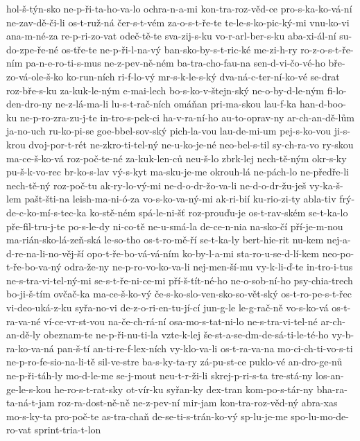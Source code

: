 hol-š-týn-sko
ne-p-ři-ta-ho-va-lo
ochra-n-a-mi
kon-tra-roz-věd-ce
pro-s-ka-ko-vá-ní
ne-zav-dě-či-li
os-t-ruž-ná
čer-s-t-vém
za-o-s-t-ře-te
te-le-s-ko-pic-ký-mi
vnu-ko-vi
ana-m-né-za
re-p-ri-zo-vat
odeč-tě-te
sva-zij-s-ku
vo-r-arl-ber-s-ku
aba-xi-ál-ní
su-do-zpe-ře-né
os-tře-te
ne-p-ři-l-na-vý
ban-sko-by-s-t-ric-ké
me-zi-h-ry
ro-z-o-s-t-ře-ním
pa-n-e-ro-ti-s-mus
ne-z-pev-ně-ném
ba-tra-cho-fau-na
sen-d-vi-čo-vé-ho
bře-zo-vá-ole-š-ko
ko-run-ních
ri-f-lo-vý
mr-s-k-le-s-ký
dva-ná-c-ter-ní-ko-vé
se-drat
roz-bře-s-ku
za-kuk-le-ným
e-mai-lech
bo-s-ko-v-štejn-ský
ne-o-by-d-le-ným
fi-lo-den-dro-ny
ne-z-lá-ma-li
lu-s-t-rač-ních
omáňan
pri-ma-skou
lau-f-ka
han-d-boo-ku
ne-p-ro-zra-zu-j-te
in-tro-s-pek-ci
ha-v-ra-ní-ho
au-to-oprav-ny
ar-ch-an-dě-lům
ja-no-uch
ru-ko-pi-se
goe-bbel-sov-ský
pich-la-vou
lau-de-mi-um
pej-s-ko-vou
ji-s-krou
dvoj-por-t-rét
ne-zkro-ti-tel-ný
ne-u-ko-je-né
neo-bel-s-til
sy-ch-ra-vo
ry-skou
ma-ce-š-ko-vá
roz-poč-te-né
za-kuk-len-ců
neu-š-lo
zbrk-lej
nech-tě-ným
okr-s-ky
pu-š-k-vo-rec
br-ko-s-lav
vý-s-kyt
ma-sku-je-me
okrouh-lá
ne-pách-lo
ne-předře-li
nech-tě-ný
roz-poč-tu
ak-ry-lo-vý-mi
ne-d-o-dr-žo-va-li
ne-d-o-dr-žu-ješ
vy-ka-š-lem
pašt-šti-na
leish-ma-ni-ó-za
vo-s-ko-va-ný-mi
ak-ri-bií
ku-rio-zi-ty
abla-tiv
frý-de-c-ko-mí-s-tec-ka
ko-stě-ném
spá-le-ni-šť
roz-prouďu-je
os-t-rav-ském
se-t-ka-lo
pře-fil-tru-j-te
po-s-le-dy
ni-co-tě
ne-u-smá-la
de-ce-n-nia
na-sko-čí
pří-je-m-nou
ma-rián-sko-lá-zeň-ská
le-so-tho
os-t-ro-mě-ří
se-t-ka-ly
bert-hie-rit
nu-kem
nej-a-d-re-na-li-no-věj-ší
opo-t-ře-bo-vá-vá-ním
ko-by-l-a-mi
sta-ro-u-se-d-lí-kem
neo-po-t-ře-bo-va-ný
odra-že-ny
ne-p-ro-vo-ko-va-li
nej-men-ší-mu
vy-k-li-ď-te
in-tro-i-tus
ne-s-tra-vi-tel-ný-mi
se-s-t-ře-ni-ce-mi
pří-š-tít-né-ho
ne-o-sob-ní-ho
psy-chia-trech
bo-ji-š-tím
ovčač-ka
ma-ce-š-ko-vý
če-s-ko-slo-ven-sko-so-vět-ský
os-t-ro-pe-s-t-řec
vi-deo-uká-z-ku
syřa-no-vi
de-z-o-ri-en-tu-jí-cí
jun-g-le
le-g-rač-ně
vo-s-ko-vá
os-t-ra-va-né
ví-ce-vr-st-vou
na-če-ch-rá-ní
osa-mo-s-tat-ni-lo
ne-s-tra-vi-tel-né
ar-ch-an-dě-ly
obeznam-te
ne-p-ři-nu-ti-la
vzte-k-lej
še-st-a-se-dm-de-sá-ti-le-té-ho
vy-b-ra-ko-va-ná
pan-š-tí
an-ti-re-f-lex-ních
vy-klo-va-li
os-t-ra-va-na
mo-ci-ch-ti-vo-s-ti
ne-p-ro-fe-sio-na-li-tě
sil-ve-stre
ba-s-ky-ta-ry
zá-pu-st-ce
puklo-vé
an-dro-ge-nů
ne-p-ři-táh-ly
mo-d-le-me
se-j-mout
neu-t-r-ži-li
skrej-p-ri-s-ta
tre-stá-ny
los-an-ge-le-s-kou
he-ro-s-t-rat-sky
ot-vír-ku
syřan-ky
dex-tran
kom-po-s-tár-ny
bha-ra-ta-ná-t-jam
roz-ra-dost-ně-ně
ne-z-pev-ní
mir-jam
kon-tra-roz-věd-ný
abra-xas
mo-s-ky-ta
pro-poč-te
as-tra-chaň
de-se-ti-s-trán-ko-vý
sp-lu-je-me
spo-lu-mo-de-ro-vat
sprint-tria-t-lon
